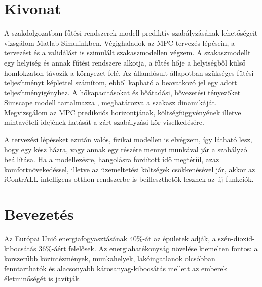 \chapter*{Kivonat}

A szakdolgozatban fűtési rendszerek modell-prediktív szabályzásának lehetőségeit vizsgálom Matlab Simulinkben.
Végighaladok az MPC tervezés lépésein, a tervezést és a validálást is szimulált szakaszmodellen végzem. A szakaszmodellt egy helyiség és annak fűtési rendszere alkotja, a fűtés hője a helyiségből külső homlokzaton távozik a környezet felé. Az állandósult állapotban szükséges fűtési teljesítményt képlettel számítom, ebből kapható a beavatkozó jel egy adott teljesítményigényhez. A hőkapacitásokat és hőátadási, hővezetési tényezőket Simscape modell tartalmazza%
, meghatározva a szakasz dinamikáját. Megvizsgálom az MPC predikciós horizontjának, költségfüggvényének illetve mintavételi idejének hatását a zárt szabályzási kör viselkedésére. 


A tervezési lépéseket ezután valós, fizikai modellen is elvégzem, így látható lesz, hogy egy kész házra, vagy annak egy részére mennyi munkával jár a szabályzó beállítása. Ha a modellezésre, hangolásra fordított idő megtérül, azaz komfortnövekedéssel, illetve az üzemeltetési költségek csökkenésével jár, akkor az iContrALL intelligens otthon rendszerbe is beilleszthetők lesznek az új funkciók.


\chapter{Bevezetés}
Az Európai Unió energiafogyasztásának 40\%-át az épületek adják, a szén-dioxid-kibocsátás 36\%-áért felelősek. Az energiahatékonyság növelése kiemelten fontos: a korszerűbb közintézmények, munkahelyek, lakóingatlanok olcsóbban fenntarthatók és alacsonyabb károsanyag-kibocsátás mellett az emberek életminőségét is javítják.


